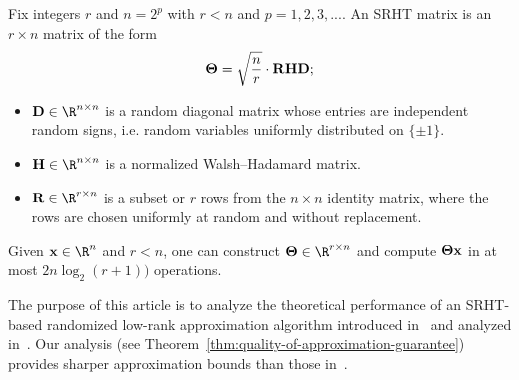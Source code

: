 \begin{definition}
\label{def:srht}

Fix integers $r$ and $n = 2^p$ with $r < n$ and $p = 1,2,3, ...$. An SRHT matrix is an $r \times n$ matrix of the form $$ {\bm{\mathrm{\Theta}}} = \sqrt{{n\over r}} \cdot {\ensuremath{\bm{\mathrm{R}}}} {\ensuremath{\bm{\mathrm{H}}}}  {\ensuremath{\bm{\mathrm{D}}}};$$
\begin{itemize}
\item $\matD \in \R^{n \times n}$ is a random diagonal matrix whose entries are independent random signs, i.e. random variables uniformly distributed on $\{\pm 1\}$.
\item $\matH \in \R^{n \times n}$ is a normalized Walsh--Hadamard matrix.
\item $\matR \in \R^{r \times n}$ is a subset or $r$ rows from the $n \times n$ identity matrix, where the rows are  chosen uniformly at random and without replacement.
\end{itemize}
\end{definition}
\begin{lemma} 
\label{prop:SRHT-compute-time}
Given $\x \in \R^n$ and $r < n$, one can construct $\matTh \in \R^{r \times n}$ and compute ${\bm{\mathrm{\Theta}}} {\mathbf x}$ in at most $2 n \log_2(r + 1) )$ operations.
\end{lemma}

The purpose of this article is to analyze the theoretical performance of an SRHT-based randomized low-rank approximation algorithm
introduced in~\cite{WLRT07} and analyzed in~\cite{WLRT07,HMT,NDT09}. Our analysis (see Theorem~\ref{thm:quality-of-approximation-guarantee})
provides sharper approximation bounds
than those in~\cite{WLRT07,HMT,NDT09}.

